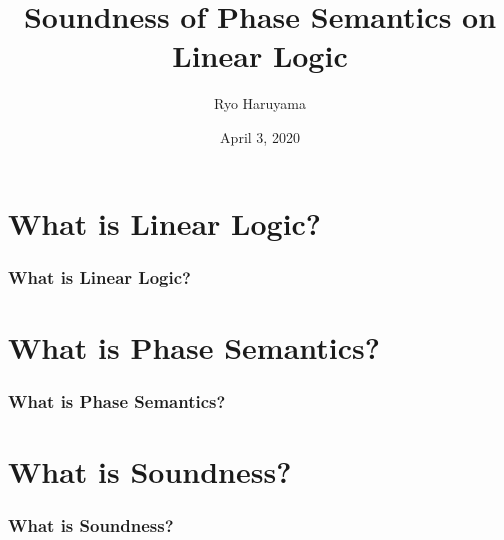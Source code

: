 \documentclass[dvipdfmx,cjk]{beamer}
\theoremstyle{example}
\begin{document}
\title[LL]{Soundness of Phase Semantics on Linear Logic} 
\author[Haruyama]{Ryo Haruyama}
\date{April 3, 2020}

\begin{frame}
  \titlepage
\end{frame}

\begin{frame}
  \tableofcontents
\end{frame}

                          \section{What is Linear Logic?}
                          
\begin{frame}
  \frametitle{What is Linear Logic?}
\end{frame}

                          \section{What is Phase Semantics?}
                          
\begin{frame} 
  \frametitle{What is Phase Semantics?}
  
\end{frame}

                          \section{What is Soundness?}
                          
\begin{frame}
  \frametitle{What is Soundness?}

  
\end{frame}

\end{document}
